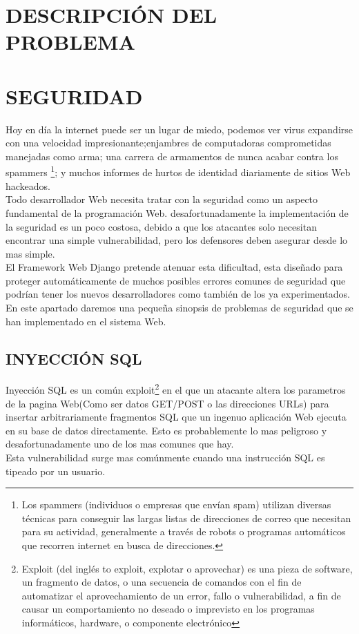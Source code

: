 \section{DESCRIPCIÓN DEL PROBLEMA}

\section{SEGURIDAD}

Hoy en día la internet puede ser un lugar de miedo, podemos ver virus expandirse con una velocidad impresionante;enjambres de computadoras comprometidas manejadas como arma; una carrera de armamentos de nunca acabar contra los spammers \footnote{Los spammers (individuos o empresas que envían spam) utilizan diversas técnicas para conseguir las largas listas de direcciones de correo que necesitan para su actividad, generalmente a través de robots o programas automáticos que recorren internet en busca de direcciones.}; y muchos informes de hurtos de identidad diariamente de sitios Web hackeados.\\
Todo desarrollador Web necesita tratar con la seguridad como un aspecto fundamental de la programación Web.
desafortunadamente la implementación de la seguridad es un poco costosa, debido a que los atacantes solo necesitan encontrar una simple vulnerabilidad, pero los defensores deben asegurar desde lo mas simple.\\
El Framework Web Django pretende atenuar esta dificultad, esta diseñado para proteger automáticamente de muchos posibles errores comunes de seguridad que podrían tener los nuevos desarrolladores como también de los ya experimentados.
En este apartado daremos una pequeña sinopsis de problemas de seguridad que se han implementado en el sistema Web.

\subsection{INYECCIÓN SQL}

Inyección SQL es un común exploit\footnote{Exploit (del inglés to exploit, explotar o aprovechar) es una pieza de software, un fragmento de datos, o una secuencia de comandos con el fin de automatizar el aprovechamiento de un error, fallo o vulnerabilidad, a fin de causar un comportamiento no deseado o imprevisto en los programas informáticos, hardware, o componente electrónico} en el que un atacante altera los parametros de la pagina Web(Como ser datos GET/POST o las direcciones URLs) para insertar arbitrariamente fragmentos SQL que un ingenuo aplicación Web ejecuta en su base de datos directamente. Esto es probablemente lo mas peligroso y desafortunadamente uno de los mas comunes que hay.\\
Esta vulnerabilidad surge mas comúnmente cuando una instrucción SQL es tipeado por un usuario.

